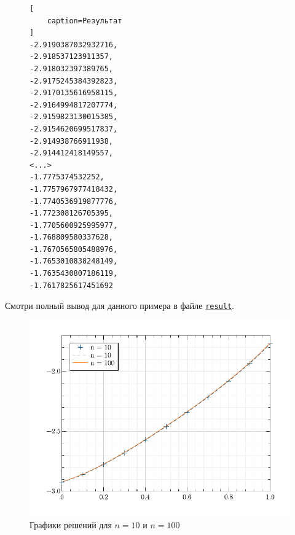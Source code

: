 \begin{figure}[H]
\begin{lstlisting}[
    caption=Результат
]
-2.9190387032932716,
-2.918537123911357,
-2.918032397389765,
-2.9175245384392823,
-2.9170135616958115,
-2.9164994817207774,
-2.9159823130015385,
-2.9154620699517837,
-2.914938766911938,
-2.914412418149557,
<...>
-1.7775374532252,
-1.7757967977418432,
-1.7740536919877776,
-1.772308126705395,
-1.7705600925995977,
-1.768809580337628,
-1.7670565805488976,
-1.7653010838248149,
-1.7635430807186119,
-1.7617825617451692
\end{lstlisting}
\end{figure}

Смотри полный вывод для данного примера в файле
\href{https://raw.githubusercontent.com/paveloom-p/P12/master/A1/result}{\footnotesize \texttt{result}}.

\begin{figure}[H]
\captionsetup{justification=centering}
\setlength{\abovecaptionskip}{-10pt}
\renewcommand{\figurename}{Рисунок}
\caption{Графики решений для $ n = 10 $ и $ n = 100 $}
\hspace{30pt}\includegraphics{../figures/comparison.pdf}
\end{figure}


